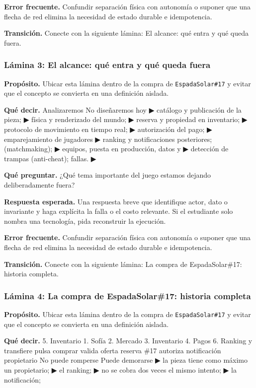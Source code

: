 \documentclass[variant=docente,cover=institutional,mode=screen]{ua-engineering-v6-article}
\begin{document}
\textbf{Error frecuente.} Confundir separación física con autonomía o suponer que una flecha de red elimina la necesidad de estado durable e idempotencia.

\textbf{Transición.} Conecte con la siguiente lámina: El alcance: qué entra y qué queda fuera.

\subsubsection*{Lámina 3: El alcance: qué entra y qué queda fuera}
\textbf{Propósito.} Ubicar esta lámina dentro de la compra de \texttt{EspadaSolar\#17} y evitar que el concepto se convierta en una definición aislada.

\textbf{Qué decir.} Analizaremos No diseñaremos hoy ▶ catálogo y publicación de la pieza; ▶ física y renderizado del mundo; ▶ reserva y propiedad en inventario; ▶ protocolo de movimiento en tiempo real; ▶ autorización del pago; ▶ emparejamiento de jugadores ▶ ranking y notificaciones posteriores; (matchmaking); ▶ equipos, puesta en producción, datos y ▶ detección de trampas (anti-cheat); fallas. ▶

\textbf{Qué preguntar.} ¿Qué tema importante del juego estamos dejando deliberadamente fuera?

\textbf{Respuesta esperada.} Una respuesta breve que identifique actor, dato o invariante y haga explícita la falla o el costo relevante. Si el estudiante solo nombra una tecnología, pida reconstruir la ejecución.

\textbf{Error frecuente.} Confundir separación física con autonomía o suponer que una flecha de red elimina la necesidad de estado durable e idempotencia.

\textbf{Transición.} Conecte con la siguiente lámina: La compra de EspadaSolar\#17: historia completa.

\subsubsection*{Lámina 4: La compra de EspadaSolar\#17: historia completa}
\textbf{Propósito.} Ubicar esta lámina dentro de la compra de \texttt{EspadaSolar\#17} y evitar que el concepto se convierta en una definición aislada.

\textbf{Qué decir.} 5. Inventario 1. Sofía 2. Mercado 3. Inventario 4. Pagos 6. Ranking y transfiere pulsa comprar valida oferta reserva \#17 autoriza notificación propietario No puede romperse Puede demorarse ▶ la pieza tiene como máximo un propietario; ▶ el ranking; ▶ no se cobra dos veces el mismo intento; ▶ la notificación;
\end{document}
